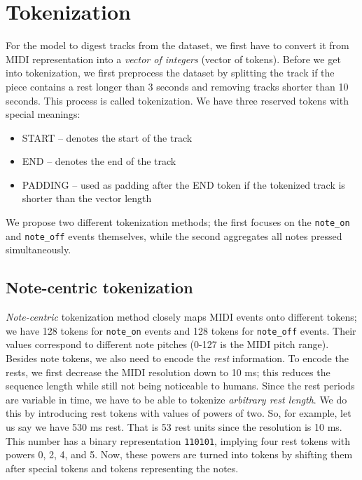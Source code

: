 \section{Tokenization}\label{sec:tokenization}

For the model to digest tracks from the dataset, we first have to convert it from MIDI representation into a \textit{vector of integers} (vector of tokens).
Before we get into tokenization, we first preprocess the dataset by splitting the track if the piece contains a rest longer than 3 seconds and removing tracks shorter than 10 seconds.
This process is called tokenization.
We have three reserved tokens with special meanings:
\begin{itemize}
    \item START -- denotes the start of the track
    \item END -- denotes the end of the track
    \item PADDING -- used as padding after the END token if the tokenized track is shorter than the vector length
\end{itemize}
We propose two different tokenization methods;
the first focuses on the \texttt{note\_on} and \texttt{note\_off} events themselves, while the second aggregates all notes pressed simultaneously.

\subsection{Note-centric tokenization}\label{subsec:note-centric-tokenization}

\textit{Note-centric} tokenization method closely maps MIDI events onto different tokens;
we have 128 tokens for \texttt{note\_on} events and 128 tokens for \texttt{note\_off} events.
Their values correspond to different note pitches (0-127 is the MIDI pitch range).
Besides note tokens, we also need to encode the \textit{rest} information.
To encode the rests, we first decrease the MIDI resolution down to 10 ms;
this reduces the sequence length while still not being noticeable to humans.
Since the rest periods are variable in time, we have to be able to tokenize \textit{arbitrary rest length}.
We do this by introducing rest tokens with values of powers of two.
So, for example, let us say we have 530 ms rest.
That is 53 rest units since the resolution is 10 ms.
This number has a binary representation \texttt{110101}, implying four rest tokens with powers 0, 2, 4, and 5.
Now, these powers are turned into tokens by shifting them after special tokens and tokens representing the notes.

